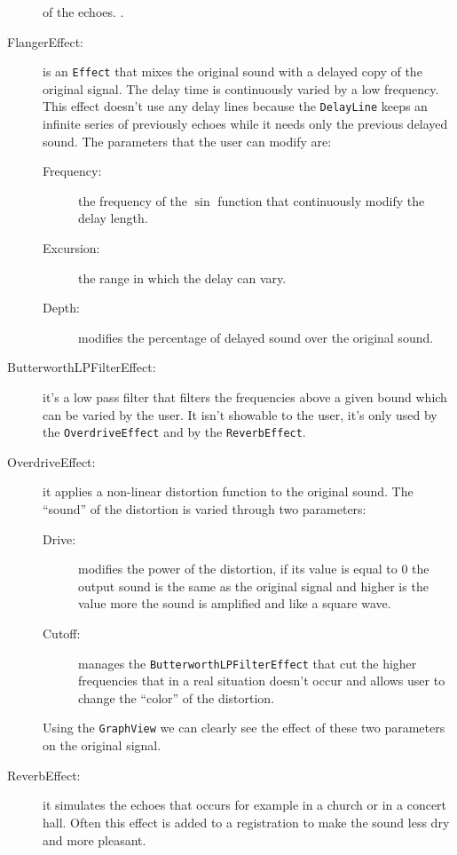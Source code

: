 \begin{description}
    of the echoes. \cite{comb}.
  \item[FlangerEffect:] is an \texttt{Effect} that mixes the
    original sound with a delayed copy of the original signal. The delay
    time is continuously varied by a low frequency.\\
    This effect doesn't use any delay lines because the \texttt{DelayLine}
    keeps an infinite series of previously echoes while it needs only
    the previous delayed sound.\cite{flanger}
    The parameters that the user can modify are:
    \begin{description}
      \item[Frequency:] the frequency of the $\sin$ function that
      continuously modify the delay length.
      \item[Excursion:] the range in which the delay can vary.
      \item[Depth:] modifies the percentage of delayed sound
      over the original sound.
    \end{description}
  \item[ButterworthLPFilterEffect:] it's a low pass filter that
    filters the frequencies above a given bound which can be varied by
    the user\cite{butterworth}.
    It isn't showable to the user, it's only used by the
    \texttt{OverdriveEffect} and by the \texttt{ReverbEffect}.
  \item[OverdriveEffect:] it applies a non-linear distortion
    function to the original sound\cite{overdrive}. The ``sound'' of the
    distortion is varied through two parameters:
    \begin{description}
      \item[Drive:] modifies the power of the distortion, if its
        value is equal to $0$ the output sound is the same as the
        original signal and higher is the value more the sound is
        amplified and like a square wave.
      \item[Cutoff:] manages the \texttt{ButterworthLPFilterEffect}
        that cut the higher frequencies that in a real situation doesn't
        occur and allows user to change the ``color'' of the distortion.
    \end{description}
    Using the \texttt{GraphView} we can clearly see the effect of these
    two parameters on the original signal.
  \item[ReverbEffect:] it simulates the echoes that occurs
    for example in a church or in a concert hall. Often this effect is
    added to a registration to make the sound less dry and more pleasant.\\

\end{description}
